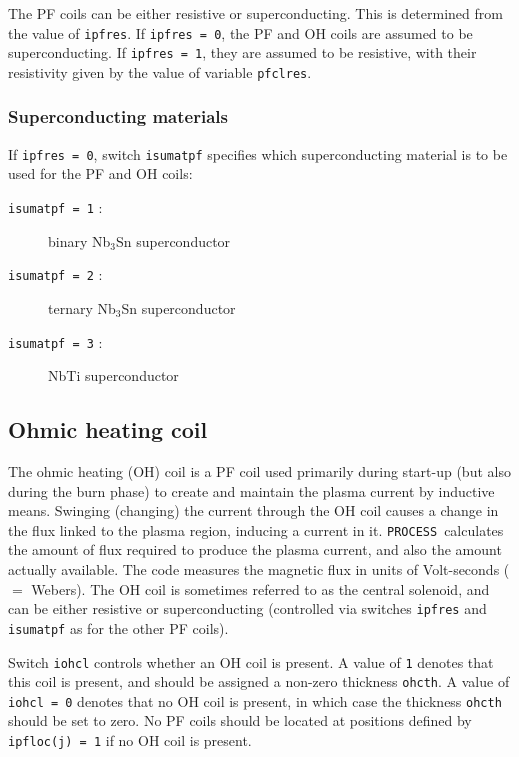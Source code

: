 \documentclass[11pt,a4paper]{report}
\newcommand{\process}{\mbox{\texttt{PROCESS}}}
\begin{document}
The PF coils can be either resistive or superconducting. This is determined
from the value of \texttt{ipfres}. If \texttt{ipfres = 0}, the PF and OH coils
are assumed to be superconducting. If \texttt{ipfres = 1}, they are assumed to
be resistive, with their resistivity given by the value of variable
\texttt{pfclres}.

\subsubsection{Superconducting materials}

If \texttt{ipfres = 0}, switch \texttt{isumatpf} specifies which
superconducting material is to be used for the PF and OH coils:
\begin{description}
\item [\texttt{isumatpf = 1} :] binary Nb$_3$Sn superconductor
\item [\texttt{isumatpf = 2} :] ternary Nb$_3$Sn superconductor
\item [\texttt{isumatpf = 3} :] NbTi superconductor
\end{description}

\subsection{Ohmic heating coil}
\label{sec:ohcoil}

The ohmic heating (OH) coil is a PF coil used primarily during start-up (but
also during the burn phase) to create and maintain the plasma current by
inductive means. Swinging (changing) the current through the OH coil causes a
change in the flux linked to the plasma region, inducing a current in
it. \process\ calculates the amount of flux required to produce the plasma
current, and also the amount actually available. The code measures the
magnetic flux in units of Volt-seconds ($=$ Webers). The OH coil is sometimes
referred to as the central solenoid, and can be either resistive or
superconducting (controlled via switches \texttt{ipfres} and \texttt{isumatpf}
as for the other PF coils).

Switch \texttt{iohcl} controls whether an OH coil is present. A value of
\texttt{1} denotes that this coil is present, and should be assigned a
non-zero thickness \texttt{ohcth}. A value of \texttt{iohcl = 0} denotes that
no OH coil is present, in which case the thickness \texttt{ohcth} should be
set to zero. No PF coils should be located at positions defined by
\texttt{ipfloc(j) = 1} if no OH coil is present.
\end{document}
